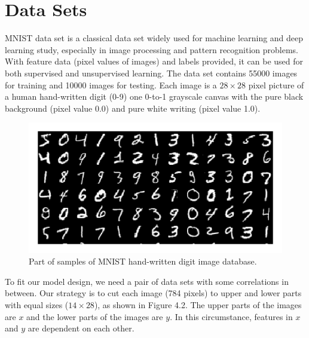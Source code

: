 \documentclass[12pt]{report} %
\begin{document}
\section{Data Sets}
MNIST data set\cite{MNIST} is a classical data set widely used for machine learning and deep learning study, especially in image processing and pattern recognition problems. With feature data (pixel values of images) and labels provided, it can be used for both supervised and unsupervised learning. The data set contains 55000 images for training and 10000 images for testing. Each image is a $28 \times 28$ pixel picture of a human hand-written digit (0-9) one 0-to-1 grayscale canvas with the pure black background (pixel value 0.0) and pure white writing (pixel value 1.0).
\begin{figure}[H]
	\centering
	\includegraphics[scale=2.5]{pictures/MNIST.png}
	\caption{Part of samples of MNIST hand-written digit image database\cite{MNISTPIC}.}
	\label{fig:1}
\end{figure}

To fit our model design, we need a pair of data sets with some correlations in between. Our strategy is to cut each image (784 pixels) to upper and lower parts with equal sizes ($14 \times 28$), as shown in Figure 4.2. The upper parts of the images are $x$ and the lower parts of the images are $y$. In this circumstance, features in $x$ and $y$ are dependent on each other.
\end{document}

